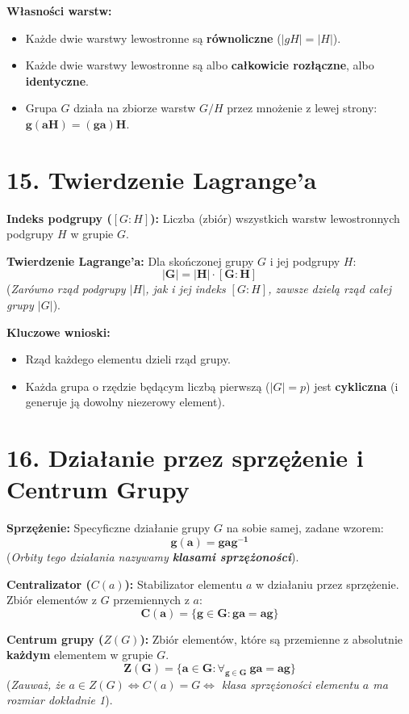 \documentclass[12pt,a4paper]{article}
\begin{document}
\noindent\textbf{Własności warstw:} %
\begin{itemize}
    \item Każde dwie warstwy lewostronne są \textbf{równoliczne} ($|gH| = |H|$). %
    \item Każde dwie warstwy lewostronne są albo \textbf{całkowicie rozłączne}, albo \textbf{identyczne}. %
    \item Grupa $G$ działa na zbiorze warstw $G/H$ przez mnożenie z lewej strony: $\mathbf{g(aH) = (ga)H}$. %
\end{itemize}

\section*{15. Twierdzenie Lagrange'a}
\noindent\textbf{Indeks podgrupy ($[G:H]$):} Liczba (zbiór) wszystkich warstw lewostronnych podgrupy $H$ w grupie $G$. %

\noindent\textbf{Twierdzenie Lagrange'a:} Dla skończonej grupy $G$ i jej podgrupy $H$: %
$$ \mathbf{|G| = |H| \cdot [G:H]} $$ %
(\textit{Zarówno rząd podgrupy $|H|$, jak i jej indeks $[G:H]$, zawsze dzielą rząd całej grupy $|G|$}). %

\noindent\textbf{Kluczowe wnioski:} %
\begin{itemize}
    \item Rząd każdego elementu dzieli rząd grupy. %
    \item Każda grupa o rzędzie będącym liczbą pierwszą ($|G|=p$) jest \textbf{cykliczna} (i generuje ją dowolny niezerowy element). %
\end{itemize}

\section*{16. Działanie przez sprzężenie i Centrum Grupy}
\noindent\textbf{Sprzężenie:} Specyficzne działanie grupy $G$ na sobie samej, zadane wzorem: %
$$ \mathbf{g(a) = gag^{-1}} $$ %
(\textit{Orbity tego działania nazywamy \textbf{klasami sprzężoności}}). %

\noindent\textbf{Centralizator ($C(a)$):} Stabilizator elementu $a$ w działaniu przez sprzężenie. Zbiór elementów z $G$ przemiennych z $a$: %
$$ \mathbf{C(a) = \{g \in G : ga = ag\}} $$ %

\noindent\textbf{Centrum grupy ($Z(G)$):} Zbiór elementów, które są przemienne z absolutnie \textbf{każdym} elementem w grupie $G$. %
$$ \mathbf{Z(G) = \{a \in G : \forall_{g \in G} \ ga = ag\}} $$ %
(\textit{Zauważ, że $a \in Z(G) \iff C(a) = G \iff$ klasa sprzężoności elementu $a$ ma rozmiar dokładnie 1}). %
\end{document}
